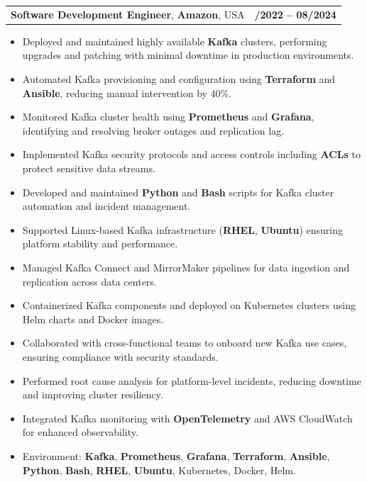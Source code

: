 \documentclass[letterpaper,11pt]{article}
\makeatletter
\newcommand{\resumeItem}[1]{
  \item\footnotesize{
    {#1 \vspace{-2pt}}
  }
}
\newcommand{\resumeSubheading}[4]{
  \vspace{-2pt}\item
    \begin{tabular*}{1.0\textwidth}[t]{l@{\extracolsep{\fill}}r}
      \textbf{\fontsize{10pt}{14pt}\selectfont #3}, \textbf{\fontsize{10pt}{14pt}\selectfont #1}, \fontsize{10pt}{14pt}\selectfont #4 & \textbf{\fontsize{10pt}{14pt}\selectfont #2} \\
    \end{tabular*}\vspace{-7pt}
}
\newcommand{\resumeItemListStart}{\begin{itemize}[leftmargin=*]}
\newcommand{\resumeItemListEnd}{\end{itemize}\vspace{-5pt}}
\makeatother
\begin{document}
\resumeSubheading
{Amazon}{10/2022 -- 08/2024}
{Software Development Engineer}{USA}
\resumeItemListStart
  \resumeItem{Deployed and maintained highly available \textbf{Kafka} clusters, performing upgrades and patching with minimal downtime in production environments.}
  \resumeItem{Automated Kafka provisioning and configuration using \textbf{Terraform} and \textbf{Ansible}, reducing manual intervention by 40\%.}
  \resumeItem{Monitored Kafka cluster health using \textbf{Prometheus} and \textbf{Grafana}, identifying and resolving broker outages and replication lag.}
  \resumeItem{Implemented Kafka security protocols and access controls including \textbf{ACLs} to protect sensitive data streams.}
  \resumeItem{Developed and maintained \textbf{Python} and \textbf{Bash} scripts for Kafka cluster automation and incident management.}
  \resumeItem{Supported Linux-based Kafka infrastructure (\textbf{RHEL}, \textbf{Ubuntu}) ensuring platform stability and performance.}
  \resumeItem{Managed Kafka Connect and MirrorMaker pipelines for data ingestion and replication across data centers.}
  \resumeItem{Containerized Kafka components and deployed on Kubernetes clusters using Helm charts and Docker images.}
  \resumeItem{Collaborated with cross-functional teams to onboard new Kafka use cases, ensuring compliance with security standards.}
  \resumeItem{Performed root cause analysis for platform-level incidents, reducing downtime and improving cluster resiliency.}
  \resumeItem{Integrated Kafka monitoring with \textbf{OpenTelemetry} and AWS CloudWatch for enhanced observability.}
  \resumeItem{Environment: \textbf{Kafka}, \textbf{Prometheus}, \textbf{Grafana}, \textbf{Terraform}, \textbf{Ansible}, \textbf{Python}, \textbf{Bash}, \textbf{RHEL}, \textbf{Ubuntu}, Kubernetes, Docker, Helm.}
\resumeItemListEnd
\end{document}

